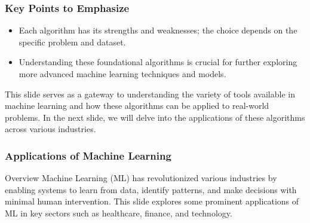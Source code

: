 \documentclass{beamer}
\begin{document}
\begin{frame}[fragile]
    \frametitle{Key Points to Emphasize}
    \begin{itemize}
        \item Each algorithm has its strengths and weaknesses; the choice depends on the specific problem and dataset.
        \item Understanding these foundational algorithms is crucial for further exploring more advanced machine learning techniques and models.
    \end{itemize}

    This slide serves as a gateway to understanding the variety of tools available in machine learning and how these algorithms can be applied to real-world problems. In the next slide, we will delve into the applications of these algorithms across various industries.
\end{frame}

\begin{frame}[fragile]
    \frametitle{Applications of Machine Learning}
    \begin{block}{Overview}
        Machine Learning (ML) has revolutionized various industries by enabling systems to learn from data, identify patterns, and make decisions with minimal human intervention. This slide explores some prominent applications of ML in key sectors such as healthcare, finance, and technology.
    \end{block}
\end{frame}
\end{document}
